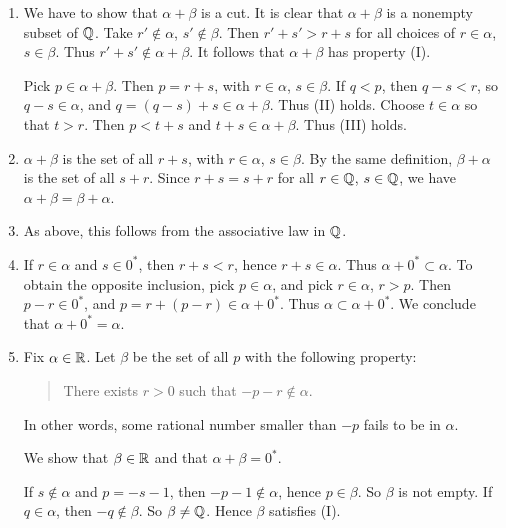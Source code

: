 \begin{enumerate}[label=(A\arabic*), leftmargin=3.1em, itemsep=6pt, topsep=5pt]
  \item We have to show that $\alpha+\beta$ is a cut. It is clear that
        $\alpha+\beta$ is a nonempty subset of $\mathbb{Q}$. Take $r' \notin \alpha$,
        $s' \notin \beta$. Then $r'+s' > r+s$ for all choices of $r \in \alpha$,
        $s \in \beta$. Thus $r'+s' \notin \alpha+\beta$. It follows that
        $\alpha+\beta$ has property (I).

        Pick $p \in \alpha+\beta$. Then $p = r+s$, with $r \in \alpha$,
        $s \in \beta$. If $q < p$, then $q - s < r$, so $q - s \in \alpha$, and
        $q = (q-s)+s \in \alpha+\beta$. Thus (II) holds. Choose $t \in \alpha$
        so that $t > r$. Then $p < t+s$ and $t+s \in \alpha+\beta$. Thus (III)
        holds.
  \item $\alpha+\beta$ is the set of all $r+s$, with $r \in \alpha$,
        $s \in \beta$. By the same definition, $\beta+\alpha$ is the set of all
        $s+r$. Since $r+s = s+r$ for all $r \in \mathbb{Q}$, $s \in \mathbb{Q}$, we have
        $\alpha+\beta = \beta+\alpha$.
  \item As above, this follows from the associative law in $\mathbb{Q}$.
  \item If $r \in \alpha$ and $s \in 0^*$, then $r+s < r$, hence
        $r+s \in \alpha$. Thus $\alpha+0^* \subset \alpha$. To obtain the
        opposite inclusion, pick $p \in \alpha$, and pick $r \in \alpha$,
        $r > p$. Then $p - r \in 0^*$, and
        $p = r+(p-r) \in \alpha+0^*$. Thus $\alpha \subset \alpha+0^*$. We
        conclude that $\alpha+0^* = \alpha$.
  \item Fix $\alpha \in \mathbb{R}$. Let $\beta$ be the set of all $p$ with the
        following property:
        \begin{quote}
        There exists $r > 0$ such that $-p-r \notin \alpha$.
        \end{quote}
        In other words, some rational number smaller than $-p$ fails to be in
        $\alpha$.

        We show that $\beta \in \mathbb{R}$ and that $\alpha+\beta = 0^*$.

        If $s \notin \alpha$ and $p = -s-1$, then $-p-1 \notin \alpha$, hence
        $p \in \beta$. So $\beta$ is not empty. If $q \in \alpha$, then
        $-q \notin \beta$. So $\beta \ne \mathbb{Q}$. Hence $\beta$ satisfies (I).


\end{enumerate}
